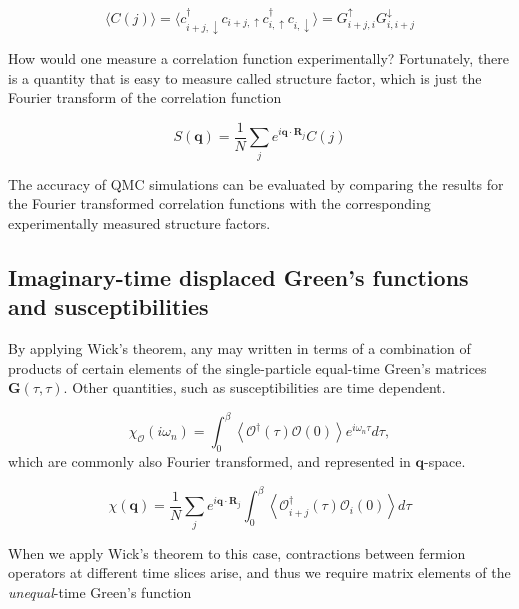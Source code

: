 \begin{equation}
\big\langle C(j) \big\rangle = \big\langle c_{i+j, \downarrow}^\dagger c_{i+j, \uparrow} c_{i, \uparrow}^\dagger c_{i, \downarrow} \big\rangle = G_{i+j, i}^\uparrow G_{i, i + j}^\downarrow
\end{equation}

How would one measure a correlation function experimentally? Fortunately, there is a quantity that is easy to measure called structure factor, which is just the Fourier transform of the correlation function

\begin{equation}
S(\bm q) = \frac{1}{N} \sum_j e^{i\bm q \cdot \bm R_j} C(j) 
\end{equation}

The accuracy of QMC simulations can be evaluated by comparing the results for the Fourier transformed correlation functions with the corresponding experimentally measured structure factors.

\subsection{Imaginary-time displaced Green's functions and susceptibilities}
\label{subsec:imtimedisp}

By applying Wick's theorem, any  may written in terms of a combination of products of certain elements of the single-particle equal-time Green's matrices $\bm G ( \tau, \tau )$.
Other  quantities, such as susceptibilities are time dependent.

\begin{equation}
\chi_{\mathcal{O}} ( i \omega_n ) = \int_0^\beta \left\langle \mathcal{O}^\dagger ( \tau ) \mathcal{O} ( 0 ) \right\rangle e^{i\omega_n \tau} d\tau ,
\end{equation}
which are commonly also Fourier transformed, and represented in $\bm q$-space. 

\begin{equation}
\chi ( \bm q ) = \frac{1}{N} \sum_j e^{i\bm q \cdot \bm R_j} \int_0^\beta \left\langle \mathcal{O}_{i + j}^\dagger ( \tau ) \mathcal{O}_i ( 0 ) \right\rangle d\tau
\end{equation}

When we apply Wick's theorem to this case, contractions between fermion operators at different time slices arise, and thus we require matrix elements of the \emph{unequal}-time Green's function

